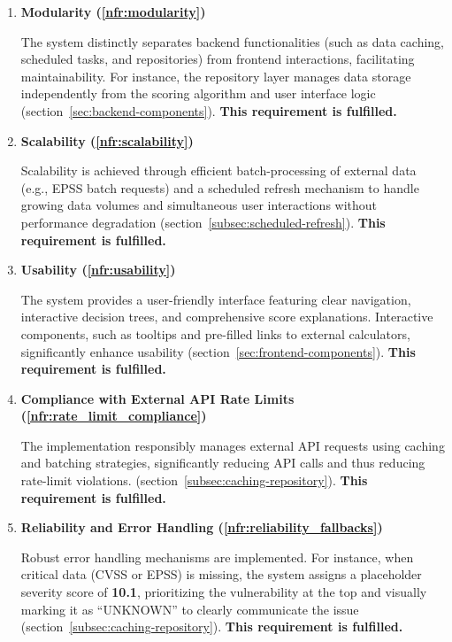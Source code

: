 \begin{enumerate}
    
    \item \textbf{Modularity (\ref{nfr:modularity})}
	      	      
    The system distinctly separates backend functionalities (such as data caching, scheduled tasks, and repositories) from frontend interactions, facilitating maintainability. For instance, the repository layer manages data storage independently from the scoring algorithm and user interface logic (section~\ref{sec:backend-components}). \textbf{This requirement is fulfilled.}
	      	            
    \item \textbf{Scalability (\ref{nfr:scalability})}
	      	            
    Scalability is achieved through efficient batch-processing of external data (e.g., \ac{EPSS} batch requests) and a scheduled refresh mechanism to handle growing data volumes and simultaneous user interactions without performance degradation (section~\ref{subsec:scheduled-refresh}). \textbf{This requirement is fulfilled.}
	      	            
    \item \textbf{Usability (\ref{nfr:usability})}
	      	            
    The system provides a user-friendly interface featuring clear navigation, interactive decision trees, and comprehensive score explanations. Interactive components, such as tooltips and pre-filled links to external calculators, significantly enhance usability (section~\ref{sec:frontend-components}). \textbf{This requirement is fulfilled.}
	      	      
    \item \textbf{Compliance with External \ac{API} Rate Limits (\ref{nfr:rate_limit_compliance})}
	      	            
    The implementation responsibly manages external \ac{API} requests using caching and batching strategies, significantly reducing \ac{API} calls and thus reducing rate-limit violations. (section~\ref{subsec:caching-repository}). \textbf{This requirement is fulfilled.}
	      	      
    \item \textbf{Reliability and Error Handling (\ref{nfr:reliability_fallbacks})}
	      	            
    Robust error handling mechanisms are implemented. For instance, when critical data (\ac{CVSS} or \ac{EPSS}) is missing, the system assigns a placeholder severity score of \textbf{10.1}, prioritizing the vulnerability at the top and visually marking it as \enquote{UNKNOWN} to clearly communicate the issue (section~\ref{subsec:caching-repository}). \textbf{This requirement is fulfilled.}
	      	            

\end{enumerate}
